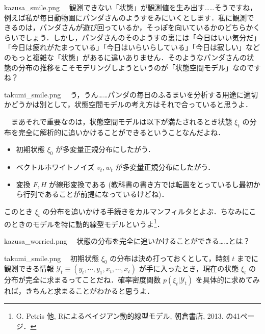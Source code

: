 \documentclass[b5paper,xelatex,ja=standard,10pt]{bxjsarticle}
\begin{document}
\begin{SERIFU}[colback=PaleIris,colbacktitle=PaleIris2]{kazusa_smile.png}
　観測できない「状態」が観測値を生み出す……そうですね，例えば私が毎日動物園にパンダさんのようすをみにいくとします．私に観測できるのは，パンダさんが遊び回っているか，そっぽを向いているかのどちらかくらいでしょう．しかし，パンダさんのそのようすの裏には「今日はいい気分だ」「今日は疲れがたまっている」「今日はいらいらしている」「今日は寂しい」などのもっと複雑な「状態」があるに違いありません．そのようなパンダさんの状態の分布の推移をこそモデリングしようというのが「状態空間モデル」なのですね？
\end{SERIFU}


\begin{SERIFU}[colback=PaleGold,colbacktitle=PaleGold2]{takumi_smile.png}
　う，うん……パンダの毎日のふるまいを分析する用途に適切かどうかは別として，状態空間モデルの考え方はそれで合っていると思うよ．

　まあそれで重要なのは，状態空間モデルは以下が満たされるとき状態 $\xi_t$ の分布を完全に解析的に追いかけることができるということなんだよね．
\begin{itemize}
  \item 初期状態 $\xi_0$ が多変量正規分布にしたがう．
  \item ベクトルホワイトノイズ $v_t, w_t$ が多変量正規分布にしたがう．
  \item 変換 $F, H$ が線形変換である (教科書の書き方では転置をとっているし最初から行列であることが前提になっているけどね)．
\end{itemize}
このとき $\xi_{t}$ の分布を追いかける手続きをカルマンフィルタとよぶ．ちなみにこのときのモデルを特に動的線型モデルというよ\footnote{G. Petris 他, Rによるベイジアン動的線型モデル, 朝倉書店, 2013. の41ページ．}．
\end{SERIFU}


\begin{SERIFU}[colback=PaleIris,colbacktitle=PaleIris2]{kazusa_worried.png}
　状態の分布を完全に追いかけることができる……とは？
\end{SERIFU}


\begin{SERIFU}[colback=PaleGold,colbacktitle=PaleGold2]{takumi_smile.png}
　初期状態 $\xi_0$ の分布は決め打っておくとして，時刻 $t$ までに観測できる情報 $\mathcal{Y}_t \equiv (y_t, \cdots, y_1, x_t, \cdots, x_t)$ が手に入ったとき，現在の状態 $\xi_t$ の分布が完全に求まるってことだね．確率密度関数 $p(\xi_t | \mathcal{Y}_t)$ を具体的に求めてみれば，きちんと求まることがわかると思うよ．
\end{SERIFU}
\end{document}
